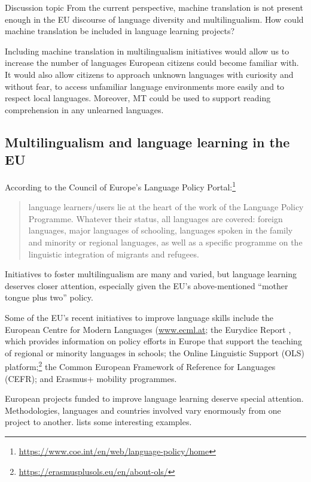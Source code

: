 \documentclass[output=paper]{langscibook}
\begin{document}
\begin{tblsframed}{Discussion topic}
From the current perspective, machine translation is not present enough in the EU discourse of language diversity and multilingualism. How could machine translation be included in language learning projects?
\end{tblsframed}

Including machine translation in multilingualism initiatives would allow us to increase the number of languages European citizens could become familiar with. It would also allow citizens to approach unknown languages with curiosity and without fear, to access unfamiliar language environments more easily and to respect local languages. Moreover, MT could be used to support reading comprehension in any unlearned languages.


\subsection{Multilingualism and language learning in the EU}

According to the Council of Europe’s Language Policy Portal:\footnote{\url{https://www.coe.int/en/web/language-policy/home}}

\begin{quote}language learners/users lie at the heart of the work of the Language Policy Programme. Whatever their status, all languages are covered: foreign languages, major languages of schooling, languages spoken in the family and minority or regional languages, as well as a specific programme on the linguistic integration of migrants and refugees.\end{quote}

\hspace*{-1mm}Initiatives to foster multilingualism are many and varied, but language learning deserves closer attention, especially given the EU’s above-mentioned “mother tongue plus two” policy.

Some of the EU’s recent initiatives to improve language skills include the European Centre for Modern Languages (\url{www.ecml.at}; the Eurydice Report \citep{Eurydice2019}, which provides information on policy efforts in Europe that support the teaching of regional or minority languages in schools; the Online Linguistic Support (OLS) platform;\footnote{\url{https://erasmusplusols.eu/en/about-ols/}} the Common European Framework of Reference for Languages (CEFR); and Erasmus+ mobility programmes.

European projects funded to improve language learning deserve special attention. Methodologies, languages and countries involved vary enormously from one project to another.  lists some interesting examples.
\end{document}
